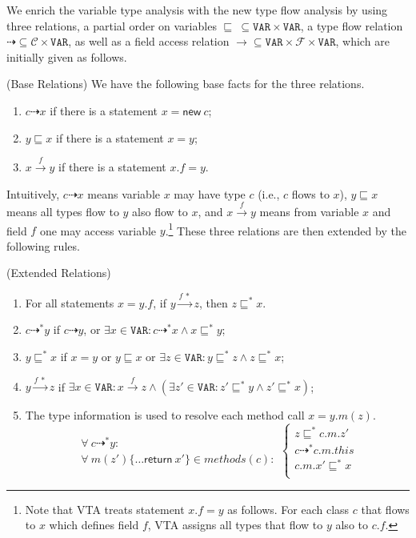 \documentclass[runningheads]{llncs}
\newcommand{\keyword}[1]{\mathsf{#1}}
\newcommand{\kw}[1]{\keyword{#1}}
\newcommand{\kwnew}[0]{\keyword{new}}
\newcommand\Var{\mathtt{VAR}}
\newcommand{\Class}{\mathcal{C}}
\newcommand{\Field}{\mathcal{F}}
\newcommand{\less}{\sqsubseteq}
\newcommand{\tflow}{\dashrightarrow}
\newcommand{\hflow}{\longrightarrow}
\newcommand{\lhflow}[1]{\stackrel{#1}{\hflow}}
\begin{document}
We enrich the variable type analysis with the new type flow analysis by using three relations,
a partial order on variables $\less\ \subseteq\Var\times\Var$, a type flow relation
$\tflow\subseteq\Class\times\Var$, as well as a field access relation $\hflow\subseteq\Var\times\Field\times\Var$,
which are initially given as follows.
\begin{definition}\label{def:base} (Base Relations)
We have the following base facts for the three relations.
\begin{enumerate}
  \item $c\tflow x$ if there is a statement $x = \kwnew\ c$;
  \item $y\less x$ if there is a statement $x = y $;
  \item $x\lhflow{f}y$ if there is a statement $x.f = y$.  %
\end{enumerate}
\end{definition}
Intuitively, $c\tflow x$ means variable $x$ may have type $c$ (i.e., $c$ flows to $x$), $y\less x$ means all types flow to $y$ also flow to $x$, and $x\lhflow{f}y$ means from variable $x$ and field $f$ one may access variable $y$.\footnote{Note that VTA treats statement $x.f = y$ as follows. For each class $c$ that flows to $x$ which defines field $f$, VTA assigns all types that flow to $y$ also to $c.f$.} These three relations are then extended by the following rules.
\begin{definition}\label{def:extension} (Extended Relations)
\begin{enumerate}
  \item For all statements $x = y.f $, if $y\lhflow{f\ *}z$, then $z\less^* x$.
  \item $c\tflow^* y$ if $c\tflow y$, or $\exists x\in\Var:c\tflow^* x\wedge x\less^* y$;
  \item $y\less^* x$ if $x=y$ or $y\less x$ or $\exists z\in\Var:y\less^* z\wedge z\less^* x$;
  \item $y\lhflow{f\ *}z$ if $\exists x\in\Var: x\lhflow{f}z\wedge (\exists z'\in\Var: z'\less^* y \wedge z'\less^*x)$;
  \item The type information is used to resolve each method call $x = y.m(z)$.
  \begin{equation*}
  \left.\begin{array}{l}\forall\ c\tflow^* y:\\ \forall\ m(z')\{\dots \kw{return}\ x'\}\in methods(c):\end{array}\right.\left\{\begin{array}{l}
        z\less^* c.m.z'\\
        c\tflow^* c.m.this\\
        c.m.x'\less^* x \\
        \end{array}\right.
  \end{equation*}
\end{enumerate}
\end{definition}
\end{document}

